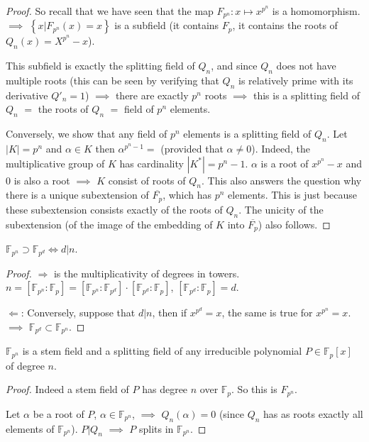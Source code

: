 \begin{proof}
So recall that we have seen that the map $F_{p^n}:x \mapsto x^{p^n}$ is a homomorphism. $\implies$ $\left\{ x|F_{p^n}(x)=x\right\}$ is a subfield (it contains $F_p$, it contains the roots of $Q_n(x)=X^{p^n}-x$).

This subfield is exactly the splitting field of $Q_n$, and since $Q_n$ does not have multiple roots (this can be seen by verifying that $Q_n$ is relatively prime with its derivative $Q'_n=1$) $\implies$ there are  exactly $p^n$ roots $\implies$ this is a splitting field of $Q_n$ $=$ the roots of $Q_n$ $=$ field of $p^n$ elements. 

Conversely, we show that any field of $p^n$ elements is a splitting field of $Q_n$. Let $|K|=p^n$ and $\alpha \in K$ then $\alpha^{p^n - 1}=$ (provided that $\alpha \neq 0$). Indeed, the multiplicative group of $K$ has cardinality $|K^*|=p^n - 1$. $\alpha$ is a root of $x^{p^n} - x$ and $0$ is also a root $\implies$ $K$ consist of roots of $Q_n$. This also answers the question why there is a unique subextension of $\overbar{F_p}$, which has $p^n$ elements. This is just because these subextension consists exactly of the roots of $Q_n$. The unicity of the subextension (of the image of the embedding of $K$ into $\overbar{F_p}$) also follows. 
\end{proof}

\begin{theorem}
$\mathbb{F}_{p^n}\supset \mathbb{F}_{p^d} \iff d|n$.
\end{theorem}
	
\begin{proof}
$\Rightarrow$ is the multiplicativity of degrees in towers. $n=[\mathbb{F}_{p^n} :\mathbb{F}_p]=[\mathbb{F}_{p^n} :\mathbb{F}_{p^d}]\cdot[\mathbb{F}_{p^d} :\mathbb{F}_p]$, $[\mathbb{F}_{p^d} :\mathbb{F}_p]=d$.

$\Leftarrow$: Conversely, suppose that $d|n$, then if $x^{p^d}=x$, the same is true for $x^{p^n}=x$. $\implies$ $\mathbb{F}_{p^d}\subset \mathbb{F}_{p^n}$.
\end{proof}
 
\begin{theorem}
$\mathbb{F}_{p^n}$ is a stem field and a splitting field of any irreducible polynomial $P\in \mathbb{F}_p[x]$ of degree $n$.
\end{theorem}
	
\begin{proof}
Indeed a stem field of $P$ has degree $n$ over $\mathbb{F}_p$. So this is $F_{p^n}$. 

Let $\alpha$ be a root of $P$, $\alpha \in \mathbb{F}_{p^n}$, $\implies$ $Q_n(\alpha)=0$ (since $Q_n$ has as roots exactly all elements of $\mathbb{F}_{p^n}$). $P|Q_n$ $\implies$ $P$ splits in $\mathbb{F}_{p^n}$.
\end{proof}
 
